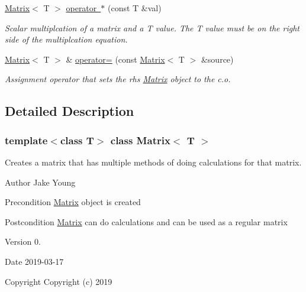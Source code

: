 \begin{DoxyCompactItemize}
\mbox{\hyperlink{class_matrix}{Matrix}}$<$ T $>$ \mbox{\hyperlink{class_matrix_a7754aef3ca206db6fb054088ba90409f}{operator $\ast$}} (const T \&val)
\begin{DoxyCompactList}\small\item\em Scalar multiplcation of a matrix and a T value. The T value must be on the right side of the multiplcation equation. \end{DoxyCompactList}\item 
\mbox{\hyperlink{class_matrix}{Matrix}}$<$ T $>$ \& \mbox{\hyperlink{class_matrix_a33c00fb6f2e9401d17d9ed615b965634}{operator=}} (const \mbox{\hyperlink{class_matrix}{Matrix}}$<$ T $>$ \&source)
\begin{DoxyCompactList}\small\item\em Assignment operator that sets the rhs \mbox{\hyperlink{class_matrix}{Matrix}} object to the c.\+o. \end{DoxyCompactList}\end{DoxyCompactItemize}


\subsection{Detailed Description}
\subsubsection*{template$<$class T$>$\newline
class Matrix$<$ T $>$}

Creates a matrix that has multiple methods of doing calculations for that matrix. 

\begin{DoxyAuthor}{Author}
Jake Young 
\end{DoxyAuthor}
\begin{DoxyPrecond}{Precondition}
\mbox{\hyperlink{class_matrix}{Matrix}} object is created 
\end{DoxyPrecond}
\begin{DoxyPostcond}{Postcondition}
\mbox{\hyperlink{class_matrix}{Matrix}} can do calculations and can be used as a regular matrix 
\end{DoxyPostcond}
\begin{DoxyVersion}{Version}
0. 
\end{DoxyVersion}
\begin{DoxyDate}{Date}
2019-\/03-\/17
\end{DoxyDate}
\begin{DoxyCopyright}{Copyright}
Copyright (c) 2019 
\end{DoxyCopyright}


